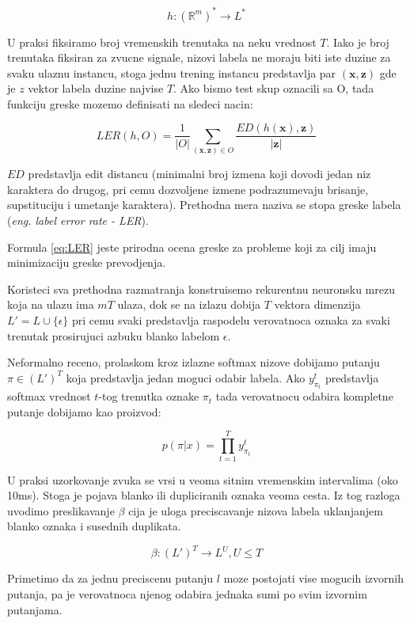\documentclass[a4paper]{article}
\begin{document}
\begin{equation}
\label{eq:pres1}
h: (\mathbb{R}^m)^* \rightarrow L^* 
\end{equation}


U praksi fiksiramo broj vremenskih trenutaka na neku vrednost $T$.  Iako je broj trenutaka fiksiran za zvucne signale,  nizovi labela ne moraju biti iste duzine za svaku ulaznu instancu, stoga jednu trening instancu predstavlja par $(\textbf{x}, \textbf{z})$ gde je $z$ vektor labela duzine najvise $T$.  Ako bismo test skup oznacili sa O, tada funkciju greske mozemo definisati na sledeci nacin:


\begin{equation}
\label{eq:LER}
LER(h, O) = \frac{1}{|O|}\sum_{(\textbf{x}, \textbf{z}) \in O}\frac{ED(h(\textbf{x}), \textbf{z})}{\textbf{|z|}}
\end{equation}


$ED$ predstavlja edit distancu (minimalni broj izmena koji dovodi jedan niz karaktera do drugog, pri cemu dozvoljene izmene podrazumevaju brisanje,  supstituciju i umetanje karaktera).  Prethodna mera naziva se stopa greske labela (\textit{eng.  label error rate - LER}).  


Formula \ref{eq:LER} jeste prirodna ocena greske za probleme koji za cilj imaju minimizaciju greske prevodjenja.

\bigskip
Koristeci sva prethodna razmatranja konstruisemo rekurentnu neuronsku mrezu koja na ulazu ima $mT$ ulaza,  dok se na izlazu dobija $T$ vektora dimenzija $L' = L \cup \{\epsilon\}$ pri cemu svaki predstavlja raspodelu verovatnoca oznaka za svaki trenutak prosirujuci azbuku blanko labelom $\epsilon$.

\bigskip
Neformalno receno,  prolaskom kroz izlazne softmax nizove dobijamo putanju $\pi \in (L')^T$ koja predstavlja jedan moguci odabir labela.  Ako $y_{\pi_t}^t$ predstavlja softmax vrednost $t$-tog trenutka oznake $\pi_t$ tada verovatnocu odabira kompletne putanje dobijamo kao proizvod:

$$p(\pi|x) = \prod_{t=1}^Ty_{\pi_t}^t$$

U praksi uzorkovanje zvuka se vrsi u veoma sitnim vremenskim intervalima (oko 10ms). Stoga je pojava blanko ili dupliciranih oznaka veoma cesta.  Iz tog razloga uvodimo preslikavanje $\beta$ cija je uloga preciscavanje nizova labela uklanjanjem blanko oznaka i susednih duplikata.  

$$\beta : (L')^T \rightarrow L^U,  U \leq T$$

Primetimo da za jednu preciscenu putanju $l$ moze postojati vise mogucih izvornih putanja,  pa je verovatnoca njenog odabira jednaka sumi po svim izvornim putanjama.
\end{document}
